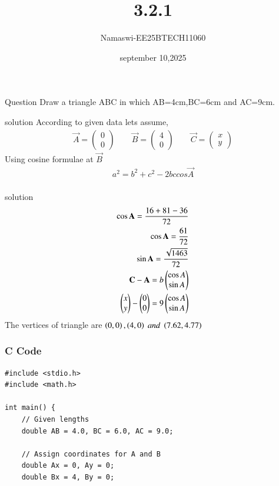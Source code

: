 \documentclass{beamer}
\begin{document}
\title 
{3.2.1}
\date{september 10,2025}


\author 
{Namaswi-EE25BTECH11060}
\frame{\titlepage}
\begin{frame}{Question}
 Draw a triangle ABC in which AB=4cm,BC=6cm and AC=9cm.
\end{frame}
\begin{frame}{solution}
According to given data lets assume,\\
\begin{align*}
\vec{A}=\begin{pmatrix}0\\0\end{pmatrix}\qquad 
\vec{B}=\begin{pmatrix}4\\0\end{pmatrix}\qquad 
\vec{C}=\begin{pmatrix}x\\y\end{pmatrix}   
\end{align*}
Using cosine formulae at $\vec{B}$ 
\begin{align}
a^2=b^2+c^2-2bccos\vec{A}\\
\end{align}
\end{frame}

\begin{frame}{solution}
\begin{align}
\cos{\vec{A}}=\frac{16+81-36}{72}\\
\cos{\vec{A}}=\frac{61}{72}\\
\sin{\vec{A}}=\frac{\sqrt{1463}}{72}\\
\vec{C}-\vec{A}=b\myvec{\cos{A}\\ \sin{A}}\\
\myvec{x\\y}-\myvec{0\\0}=9\myvec{\cos{A}\\ \sin{A}}\\
 
\end{align}
The vertices of triangle are $\left(0,0\right),\left(4,0\right)\; and\; \left(7.62,4.77\right) $\\  
\end{frame}
 
\begin{frame}[fragile]
    \frametitle{C Code }

    \begin{lstlisting}
#include <stdio.h>
#include <math.h>

int main() {
    // Given lengths
    double AB = 4.0, BC = 6.0, AC = 9.0;

    // Assign coordinates for A and B
    double Ax = 0, Ay = 0;
    double Bx = 4, By = 0;

 \end{lstlisting}
\end{frame}
\end{document}
